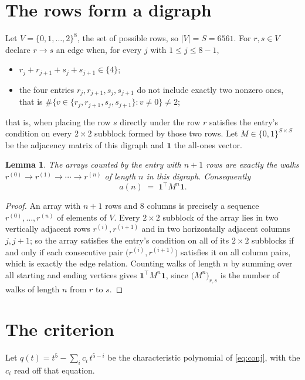 \documentclass[11pt,a4paper]{article}
\theoremstyle{plain}
\newtheorem{lemma}[theorem]{Lemma}
\theoremstyle{definition}
\begin{document}
\section{The rows form a digraph}

Let $V=\{0,1,\dots,2\}^{8}$, the set of possible rows, so $|V|=S=6561$. For
$r,s\in V$ declare $r\to s$ an edge when, for every $j$ with $1\le j\le 8-1$,
\begin{itemize}
\item $r_j+r_{j+1}+s_j+s_{j+1}\in\{4\}$;
\item the four entries $r_j,r_{j+1},s_j,s_{j+1}$ do not include exactly two nonzero ones, that is $\#\bigl\{v\in\{r_j,r_{j+1},s_j,s_{j+1}\}: v\ne0\bigr\}\ne2$;
\end{itemize}
that is, when placing the row $s$ directly under the row $r$ satisfies the entry's
condition on every $2\times2$ subblock formed by those two rows. Let $M\in\{0,1\}^{S\times
S}$ be the adjacency matrix of this digraph and $\mathbf{1}$ the all-ones vector.

\begin{lemma}\label{lem:walk}
The arrays counted by the entry with $n+1$ rows are exactly the walks
$r^{(0)}\to r^{(1)}\to\cdots\to r^{(n)}$ of length $n$ in this digraph. Consequently
\[
a(n)\;=\;\mathbf{1}^{\!\top}M^{n}\mathbf{1} .
\]
\end{lemma}

\begin{proof}
An array with $n+1$ rows and $8$ columns is precisely a sequence
$r^{(0)},\dots,r^{(n)}$ of elements of $V$. Every $2\times2$ subblock of the array lies
in two vertically adjacent rows $r^{(i)},r^{(i+1)}$ and in two horizontally adjacent
columns $j,j+1$; so the array satisfies the entry's condition on all of its $2\times2$
subblocks if and only if each consecutive pair $\bigl(r^{(i)},r^{(i+1)}\bigr)$ satisfies
it on all column pairs, which is exactly the edge relation. Counting walks of length $n$ by
summing over all starting and ending vertices gives
$\mathbf{1}^{\!\top}M^{n}\mathbf{1}$, since
$\bigl(M^{n}\bigr)_{r,s}$ is the number of walks of length $n$ from $r$ to $s$.
\end{proof}

\section{The criterion}

Let $q(t)=t^{5}-\sum_{i}c_i\,t^{5-i}$ be the characteristic polynomial of
\eqref{eq:conj}, with the $c_i$ read off that equation.
\end{document}
